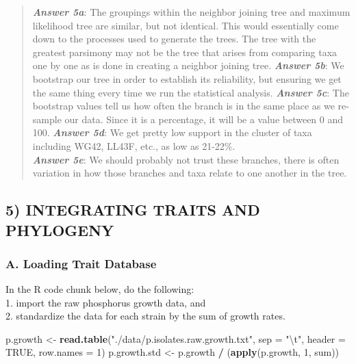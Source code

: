 \documentclass[]{article}
\newenvironment{Shaded}{\begin{snugshade}}{\end{snugshade}}
\newcommand{\KeywordTok}[1]{\textcolor[rgb]{0.13,0.29,0.53}{\textbf{#1}}}
\newcommand{\DataTypeTok}[1]{\textcolor[rgb]{0.13,0.29,0.53}{#1}}
\newcommand{\DecValTok}[1]{\textcolor[rgb]{0.00,0.00,0.81}{#1}}
\newcommand{\CharTok}[1]{\textcolor[rgb]{0.31,0.60,0.02}{#1}}
\newcommand{\StringTok}[1]{\textcolor[rgb]{0.31,0.60,0.02}{#1}}
\newcommand{\OtherTok}[1]{\textcolor[rgb]{0.56,0.35,0.01}{#1}}
\newcommand{\OperatorTok}[1]{\textcolor[rgb]{0.81,0.36,0.00}{\textbf{#1}}}
\newcommand{\NormalTok}[1]{#1}
\begin{document}
\begin{quote}
\textbf{\emph{Answer 5a}}: The groupings within the neighbor joining
tree and maximum likelihood tree are similar, but not identical. This
would essentially come down to the processes used to generate the trees.
The tree with the greatest parsimony may not be the tree that arises
from comparing taxa one by one as is done in creating a neighbor joining
tree. \textbf{\emph{Answer 5b}}: We bootstrap our tree in order to
establish its reliability, but ensuring we get the same thing every time
we run the statistical analysis. \textbf{\emph{Answer 5c}}: The
bootstrap values tell us how often the branch is in the same place as we
re-sample our data. Since it is a percentage, it will be a value between
0 and 100. \textbf{\emph{Answer 5d}}: We get pretty low support in the
cluster of taxa including WG42, LL43F, etc., as low as 21-22\%.\\
\textbf{\emph{Answer 5e}}: We should probably not trust these branches,
there is often variation in how those branches and taxa relate to one
another in the tree.
\end{quote}

\subsection{5) INTEGRATING TRAITS AND
PHYLOGENY}\label{integrating-traits-and-phylogeny}

\subsubsection{A. Loading Trait
Database}\label{a.-loading-trait-database}

In the R code chunk below, do the following:\\
1. import the raw phosphorus growth data, and\\
2. standardize the data for each strain by the sum of growth rates.

\begin{Shaded}
\begin{Highlighting}[]
\NormalTok{p.growth <-}\StringTok{ }\KeywordTok{read.table}\NormalTok{(}\StringTok{"./data/p.isolates.raw.growth.txt"}\NormalTok{, }\DataTypeTok{sep =} \StringTok{"}\CharTok{\textbackslash{}t}\StringTok{"}\NormalTok{, }\DataTypeTok{header =} \OtherTok{TRUE}\NormalTok{,}
                       \DataTypeTok{row.names =} \DecValTok{1}\NormalTok{)}
\NormalTok{p.growth.std <-}\StringTok{ }\NormalTok{p.growth }\OperatorTok{/}\StringTok{ }\NormalTok{(}\KeywordTok{apply}\NormalTok{(p.growth, }\DecValTok{1}\NormalTok{, sum))}
\end{Highlighting}
\end{Shaded}
\end{document}

